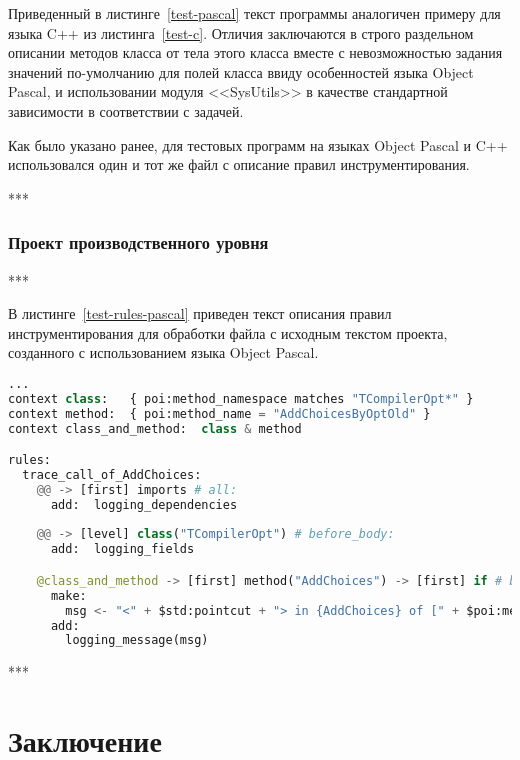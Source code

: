 Приведенный в листинге~\ref{test-pascal} текст программы аналогичен примеру для языка C++ из листинга~\ref{test-c}.
Отличия заключаются в строго раздельном описании методов класса от тела этого класса вместе с невозможностью задания значений по-умолчанию для полей класса ввиду особенностей языка Object Pascal, и использовании модуля <<SysUtils>> в качестве стандартной зависимости в соответствии с задачей.

Как было указано ранее, для тестовых программ на языках Object Pascal и C++ использовался один и тот же файл с описание правил инструментирования.

***

\subsubsection{Проект производственного уровня}

***

В листинге~\ref{test-rules-pascal} приведен текст описания правил инструментирования для обработки файла с исходным текстом проекта, созданного с использованием языка Object Pascal.

\begin{lstlisting}[frame=single, language=Python, label={test-rules-pascal}, caption={Описание правил инструментирования. Object Pascal-проект.}]
...
context class:   { poi:method_namespace matches "TCompilerOpt*" }
context method:  { poi:method_name = "AddChoicesByOptOld" }
context class_and_method:  class & method

rules:
  trace_call_of_AddChoices:
    @@ -> [first] imports # all:
      add:  logging_dependencies
  
    @@ -> [level] class("TCompilerOpt") # before_body:
      add:  logging_fields

    @class_and_method -> [first] method("AddChoices") -> [first] if # before:
      make:
        msg <- "<" + $std:pointcut + "> in {AddChoices} of [" + $poi:method_name_full + "] method";
      add:
        logging_message(msg)
\end{lstlisting}

***

\section{Заключение}

